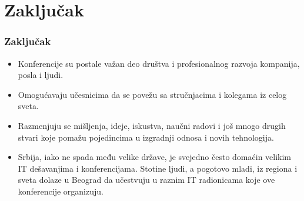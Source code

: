 \documentclass{beamer}
\begin{document}
\section{Zaključak}

\begin{frame}[fragile]\frametitle{Zaključak}
\begin{itemize}
    \item Konferencije su postale važan deo društva i profesionalnog razvoja kompanija, posla i ljudi.
    \item Omogućavaju učesnicima da se povežu sa stručnjacima i kolegama iz celog sveta.
    \item Razmenjuju se mišljenja, ideje, iskustva, naučni radovi i još mnogo drugih stvari koje pomažu pojedincima u izgradnji odnosa i novih tehnologija.
    \item Srbija, iako ne spada među velike države, je svejedno često domaćin velikim IT dešavanjima i konferencijama. Stotine ljudi, a pogotovo mladi, iz regiona i sveta dolaze u Beograd da učestvuju u raznim IT radionicama koje ove konferencije organizuju.
	\end{itemize}
\end{frame}
\end{document}
